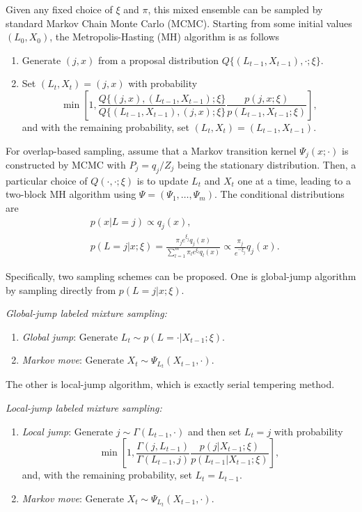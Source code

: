 Given any fixed choice of $\xi$ and $\pi$, this mixed ensemble can be sampled by standard Markov Chain Monte Carlo (MCMC). Starting from some initial values $(L_0,X_0)$, the Metropolis-Hasting (MH) algorithm is as follows
\begin{enumerate}
	\item Generate $(j,x)$ from a proposal distribution $Q\{(L_{t-1},X_{t-1}),\cdot;\xi\}$.
	\item Set $(L_t,X_t)=(j,x)$ with probability
	\[
	\min{\left[1,\frac{Q\{(j,x),(L_{t-1},X_{t-1});\xi\}}{Q\{(L_{t-1},X_{t-1}),(j,x);\xi\}}\frac{p(j,x;\xi)}{p(L_{t-1},X_{t-1};\xi)}\right]},
	\]
	and with the remaining probability, set $(L_t,X_t)=(L_{t-1},X_{t-1})$.
\end{enumerate}

For overlap-based sampling, assume that a Markov transition kernel $\Psi_j(x;\cdot)$ is constructed by MCMC with $P_j=q_j/Z_j$ being the stationary distribution. Then, a particular choice of $Q(\cdot,\cdot;\xi)$ is to update $L_t$ and $X_t$ one at a time, leading to a two-block MH algorithm using $\Psi=(\Psi_1,\dots,\Psi_m)$. The conditional distributions are
\begin{align}
	&p(x|L=j)\propto q_j(x),\\
	&p(L=j|x;\xi)=\frac{\pi_je^{\xi_j}q_j(x)}{\sum_{l=1}^m\pi_le^{\xi_l}q_l(x)}\propto\frac{\pi_j}{e^{-\xi_j}}q_j(x).
\end{align}

Specifically, two sampling schemes can be proposed. One is global-jump algorithm by sampling directly from $p(L=j|x;\xi)$.

\textit{Global-jump labeled mixture sampling:}
\begin{enumerate}
	\item \textit{Global jump}: Generate $L_t\sim p(L=\cdot|X_{t-1};\xi)$.
	\item \textit{Markov move}: Generate $X_t\sim \Psi_{L_t}(X_{t-1},\cdot)$.
\end{enumerate}

The other is local-jump algorithm, which is exactly serial tempering method.

\textit{Local-jump labeled mixture sampling:}
\begin{enumerate}
	\item \textit{Local jump}: Generate $j\sim \Gamma(L_{t-1},\cdot)$ and then set $L_t=j$ with probability
	\begin{equation*}
	   \min{\left[1,\frac{\Gamma(j,L_{t-1})}{\Gamma(L_{t-1},j)}\frac{p(j|X_{t-1};\xi)}{p(L_{t-1}|X_{t-1};\xi)}\right]},
	\end{equation*}
	and, with the remaining probability, set $L_t=L_{t-1}$.
	\item \textit{Markov move}: Generate $X_t\sim \Psi_{L_t}(X_{t-1},\cdot)$.
\end{enumerate}

